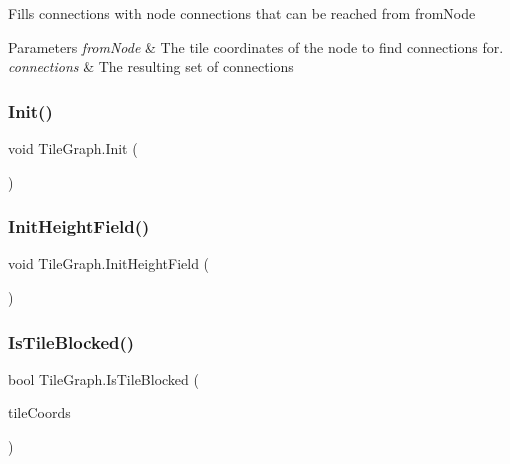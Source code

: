 Fills connections with node connections that can be reached from from\+Node 


\begin{DoxyParams}{Parameters}
{\em from\+Node} & The tile coordinates of the node to find connections for.\\
\hline
{\em connections} & The resulting set of connections\\
\hline
\end{DoxyParams}
\mbox{\label{class_tile_graph_a349a2602be0a8c9473aed6103955a2a6}} 
\subsubsection{\texorpdfstring{Init()}{Init()}}
{\footnotesize\ttfamily void Tile\+Graph.\+Init (\begin{DoxyParamCaption}{ }\end{DoxyParamCaption})}

\mbox{\label{class_tile_graph_a839b7d0deee777d52006ad5678170694}} 
\subsubsection{\texorpdfstring{Init\+Height\+Field()}{InitHeightField()}}
{\footnotesize\ttfamily void Tile\+Graph.\+Init\+Height\+Field (\begin{DoxyParamCaption}{ }\end{DoxyParamCaption})}

\mbox{\label{class_tile_graph_a9213b3332566a8e720dd28a05376001c}} 
\subsubsection{\texorpdfstring{Is\+Tile\+Blocked()}{IsTileBlocked()}}
{\footnotesize\ttfamily bool Tile\+Graph.\+Is\+Tile\+Blocked (\begin{DoxyParamCaption}\item[{\mbox{\hyperlink{struct_int_point}{Int\+Point}}}]{tile\+Coords }\end{DoxyParamCaption})}

